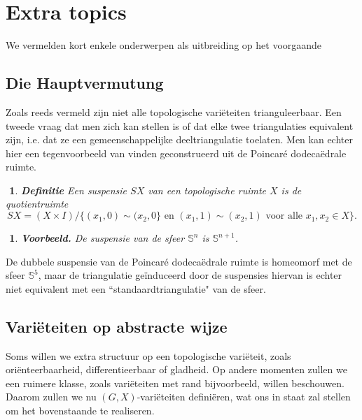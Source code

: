 \documentclass[12pt]{book}
\newtheorem{vbh}[stelh]{$\!\!$}
\newenvironment{vb}{\begin{vbh} \em {\bf Voorbeeld.} }{\end{vbh}}
\newtheorem{dfh}[stelh]{$\!\!$}
\newenvironment{df}{\begin{dfh} \em {\bf Definitie }}{\end{dfh}}
\begin{document}
\section{Extra topics}
We vermelden kort enkele onderwerpen als uitbreiding op het voorgaande
 
\subsection{Die Hauptvermutung}

Zoals reeds vermeld zijn niet alle topologische vari\"eteiten trianguleerbaar. Een tweede vraag dat men zich kan stellen is of dat elke twee triangulaties equivalent zijn, i.e. dat ze een gemeenschappelijke deeltriangulatie toelaten. Men kan echter hier een tegenvoorbeeld van vinden geconstrueerd uit de Poincar\'e dodeca\"edrale ruimte.

\begin{df}
Een \emph{suspensie} $SX$ van een topologische ruimte $X$ is de quotientruimte
$$ SX = (X \times I ) / \{(x_1,0 ) \sim (x_2, 0 \} \mbox{ en } (x_1, 1 ) \sim (x_2,1) \mbox{ voor alle } x_1, x_2 \in X \}. $$
\end{df}



\begin{vb}
De suspensie van de sfeer $\mathbb{S}^n$ is $\mathbb{S}^{n+1}$.
\end{vb}

De dubbele suspensie van de Poincar\'e dodeca\"edrale ruimte is homeomorf met de sfeer $\mathbb{S}^5$, maar de triangulatie ge\"induceerd door de suspensies hiervan is echter niet equivalent met een ``standaardtriangulatie" van de sfeer.

\subsection{Vari\"eteiten op abstracte wijze}

Soms willen we extra structuur op een topologische vari\"eteit, zoals ori\"enteerbaarheid, differentieerbaar of gladheid. Op andere momenten zullen we een ruimere klasse, zoals vari\"eteiten met rand bijvoorbeeld, willen beschouwen. Daarom zullen we nu $(G,X)$-vari\"eteiten defini\"eren, wat ons in staat zal stellen om het bovenstaande te realiseren.
\end{document}
